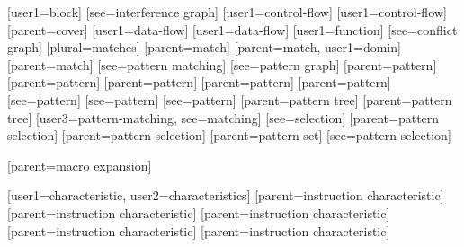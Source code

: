 
[user1={block}]
[see={interference graph}]
[user1={control-flow}]
[user1={control-flow}]
[parent={cover}]
[user1={data-flow}]
[user1={data-flow}]
[user1={function}]
[see={conflict graph}]
[plural=matches]
[parent={match}]
[parent={match}, user1={domin}]
[parent={match}]
[see={pattern matching}]
[see={pattern graph}]
[parent={pattern}]
[parent={pattern}]
[parent={pattern}]
[parent={pattern}]
[parent={pattern}]
[see={pattern}]
[see={pattern}]
[see={pattern}]
[parent={pattern tree}]
[parent={pattern tree}]
[user3={pattern-matching}, see={matching}]
[see={selection}]
[parent={pattern selection}]
[parent={pattern selection}]
[parent={pattern set}]
[see={pattern selection}]



[parent={macro expansion}]

%
        [user1={characteristic}, user2={characteristics}]
%
        [parent={instruction characteristic}]
%
        [parent={instruction characteristic}]
%
        [parent={instruction characteristic}]
%
        [parent={instruction characteristic}]
%
        [parent={instruction characteristic}]


